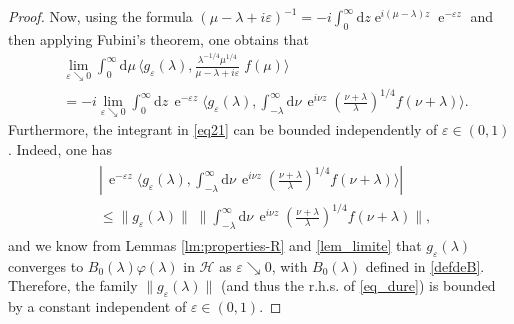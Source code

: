 \documentclass{article}
\def\d{\mathrm{d}}
\def\H{\mathcal H}
\def\e{\mathop{\mathrm{e}}\nolimits}
\begin{document}
\begin{proof}
Now, using the formula
$
(\mu-\lambda+i\varepsilon)^{-1}
=-i\int_0^\infty\d z\e^{i(\mu-\lambda)z}\e^{-\varepsilon z}
$
and then applying Fubini's theorem, one obtains that
\begin{align}
&\lim_{\varepsilon\searrow0}\int_0^\infty\d\mu\,\Big\langle g_\varepsilon(\lambda),
\frac{\lambda^{-1/4}\mu^{1/4}}{\mu-\lambda+i\varepsilon}\;\!f(\mu)
\Big\rangle\nonumber\\
&=-i\lim_{\varepsilon\searrow0}\int_0^\infty\d z\,\e^{-\varepsilon z}
\Big\langle g_\varepsilon(\lambda),\int_{-\lambda}^\infty\d\nu\,\e^{i\nu z}
\left(\frac{\nu+\lambda}{\lambda}\right)^{1/4}f(\nu+\lambda)
\Big\rangle.\label{eq21}
\end{align}
Furthermore, the integrant in \eqref{eq21} can be bounded independently of
$\varepsilon\in(0,1)$. Indeed, one has
\begin{align}\label{eq_dure}
\begin{split}
&\left|\,\e^{-\varepsilon z}\Big\langle g_\varepsilon(\lambda),
\int_{-\lambda}^\infty\d\nu\,\e^{i\nu z}
\left(\frac{\nu+\lambda}{\lambda}\right)^{1/4}f(\nu+\lambda)
\Big\rangle\right|\\
&\le\big\|g_\varepsilon(\lambda)\big\|\;\!\bigg\|\int_{-\lambda}^\infty\d\nu\,
\e^{i\nu z}\left(\frac{\nu+\lambda}{\lambda}\right)^{1/4}
f(\nu+\lambda)\bigg\|,
\end{split}
\end{align}
and we know from Lemmas \ref{lm:properties-R} and \ref{lem_limite} that
$g_\varepsilon(\lambda)$ converges to
$
B_0(\lambda)\varphi(\lambda)
$
in $\H$ as $\varepsilon\searrow0$, with $B_0(\lambda)$ defined in \eqref{defdeB}. 
Therefore, the family
$\|g_\varepsilon(\lambda)\|$ (and thus the r.h.s. of \eqref{eq_dure}) is
bounded by a constant independent of $\varepsilon\in(0,1)$.


\end{proof}
\end{document}
